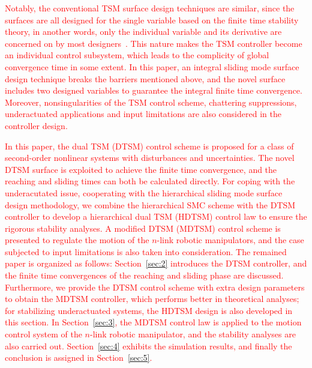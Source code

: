 \documentclass[3p]{elsarticle}
\theoremstyle{plain}
\theoremstyle{remark}
\begin{document}
\textcolor{red}{Notably, the conventional TSM surface design techniques are similar, since the surfaces are all designed for the single variable based on the finite time stability theory, in another words, only the individual variable and its derivative are concerned on by most designers~\cite{mu2016switching}. This nature makes the TSM controller become an individual control subsystem, which leads to the complicity of global convergence time in some extent. In this paper, an integral sliding mode  surface design technique breaks the barriers mentioned above, and the novel surface includes two designed variables to guarantee the integral finite time convergence. Moreover, nonsingularities of the TSM control scheme, chattering suppressions, underactuated applications and input limitations are also considered in the controller design.}

\textcolor{red}{In this paper, the dual TSM (DTSM) control scheme is proposed for a class of second-order nonlinear systems with disturbances and uncertainties. The novel DTSM surface is exploited to achieve the finite time convergence, and the reaching and sliding times can both be calculated directly. For coping with the underacutated issue, cooperating with the hierarchical sliding mode  surface design methodology, we combine the hierarchical SMC scheme with the DTSM controller to develop a hierarchical dual TSM (HDTSM) control law to ensure the rigorous stability analyses. A modified DTSM (MDTSM) control scheme is presented to regulate the motion of the $n$-link robotic manipulators, and the case subjected to input limitations is also taken into consideration. The remained paper is organized as follows: Section~\ref{sec:2} introduces the DTSM controller, and the finite time convergences of the reaching and sliding phase are discussed. Furthermore, we provide the DTSM control scheme with extra design parameters to obtain the MDTSM controller, which performs better in theoretical analyses; for stabilizing underactuated systems, the HDTSM design is also developed in this section. In Section~\ref{sec:3}, the MDTSM control law is applied to the motion control system of the $n$-link robotic  manipulator, and the stability analyses are also carried out. Section~\ref{sec:4} exhibits the simulation results, and finally the conclusion is assigned in Section~\ref{sec:5}.}
\end{document}
